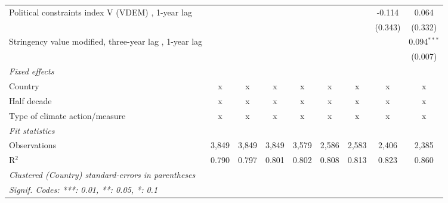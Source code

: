 \begin{table}[htbp]
\begin{tabular}{lcccccccc}
      Political constraints index V (VDEM) , 1-year lag                                                        &               &                &                &                &               &               & -0.114        & 0.064\\   
                                                                                                               &               &                &                &                &               &               & (0.343)       & (0.332)\\   
      Stringency value modified, three-year lag , 1-year lag                                                   &               &                &                &                &               &               &               & 0.094$^{***}$\\   
                                                                                                               &               &                &                &                &               &               &               & (0.007)\\   
      \emph{Fixed effects}\\
      Country                                                                                                  & x             & x              & x              & x              & x             & x             & x             & x\\  
      Half decade                                                                                              & x             & x              & x              & x              & x             & x             & x             & x\\  
      Type of climate action/measure                                                                           & x             & x              & x              & x              & x             & x             & x             & x\\  
      \midrule \emph{Fit statistics}\\
      Observations                                                                                             & 3,849         & 3,849          & 3,849          & 3,579          & 2,586         & 2,583         & 2,406         & 2,385\\  
      R$^2$                                                                                                    & 0.790         & 0.797          & 0.801          & 0.802          & 0.808         & 0.813         & 0.823         & 0.860\\  
      \midrule
      \multicolumn{9}{l}{\emph{Clustered (Country) standard-errors in parentheses}}\\
      \multicolumn{9}{l}{\emph{Signif. Codes: ***: 0.01, **: 0.05, *: 0.1}}\\
   \end{tabular}
\end{table}


